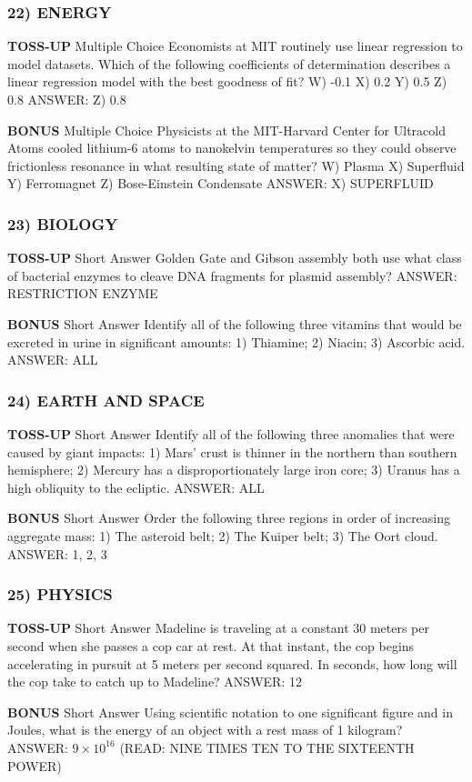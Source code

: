 \documentclass{article}
\begin{document}
\subsubsection*{22) ENERGY}
\textbf{TOSS-UP}
Multiple Choice Economists at MIT routinely use linear regression to model datasets. Which of the following coefficients of determination describes a linear regression model with the best goodness of fit?
W) -0.1
X) 0.2
Y) 0.5
Z) 0.8
ANSWER: Z) 0.8

\textbf{BONUS}
Multiple Choice Physicists at the MIT-Harvard Center for Ultracold Atoms cooled lithium-6 atoms to nanokelvin temperatures so they could observe frictionless resonance in what resulting state of matter?
W) Plasma
X) Superfluid
Y) Ferromagnet
Z) Bose-Einstein Condensate
ANSWER: X) SUPERFLUID

\subsubsection*{23) BIOLOGY}
\textbf{TOSS-UP}
Short Answer Golden Gate and Gibson assembly both use what class of bacterial enzymes to cleave DNA fragments for plasmid assembly?
ANSWER: RESTRICTION ENZYME

\textbf{BONUS}
Short Answer Identify all of the following three vitamins that would be excreted in urine in significant amounts: 1) Thiamine; 2) Niacin; 3) Ascorbic acid.
ANSWER: ALL

\subsubsection*{24) EARTH AND SPACE}
\textbf{TOSS-UP}
Short Answer Identify all of the following three anomalies that were caused by giant impacts: 1) Mars' crust is thinner in the northern than southern hemisphere; 2) Mercury has a disproportionately large iron core; 3) Uranus has a high obliquity to the ecliptic.
ANSWER: ALL

\textbf{BONUS}
Short Answer Order the following three regions in order of increasing aggregate mass: 1) The asteroid belt; 2) The Kuiper belt; 3) The Oort cloud.
ANSWER: 1, 2, 3

\subsubsection*{25) PHYSICS}
\textbf{TOSS-UP}
Short Answer Madeline is traveling at a constant 30 meters per second when she passes a cop car at rest. At that instant, the cop begins accelerating in pursuit at 5 meters per second squared. In seconds, how long will the cop take to catch up to Madeline?
ANSWER: 12

\textbf{BONUS}
Short Answer Using scientific notation to one significant figure and in Joules, what is the energy of an object with a rest mass of 1 kilogram?
ANSWER: $9\times10^{16}$ (READ: NINE TIMES TEN TO THE SIXTEENTH POWER)
\end{document}
